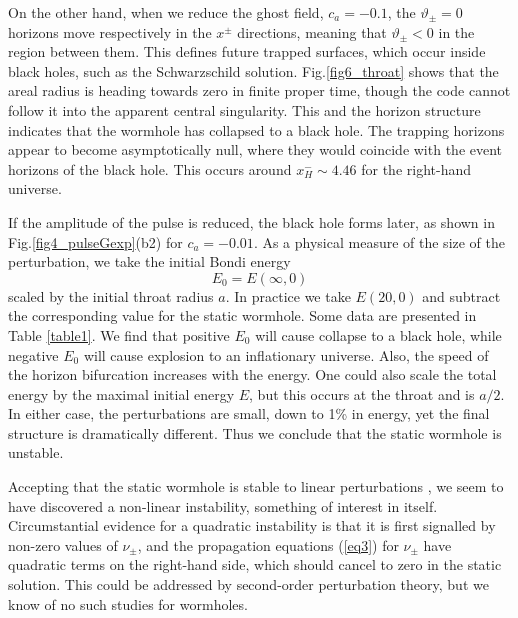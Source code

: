\documentclass[aps,showpacs,twocolumn,draft,eqsecnum]{revtex4}
\begin{document}
On the other hand, when we reduce the ghost field, $c_a = -0.1$, the
$\vartheta_\pm=0$ horizons move respectively in the $x^\pm$ directions, meaning
that $\vartheta_\pm<0$ in the region between them. This defines future trapped
surfaces, which occur inside black holes, such as the Schwarzschild solution.
Fig.\ref{fig6_throat} shows that the areal radius is heading towards zero in
finite proper time, though the code cannot follow it into the apparent central
singularity. This and the horizon structure indicates that the wormhole has
collapsed to a black hole. The trapping horizons appear to become
asymptotically null, where they would coincide with the event horizons of the
black hole. This occurs around $x^-_H \sim 4.46$ for the right-hand
universe.

If the amplitude of the pulse is reduced, the black hole forms later, as shown
in Fig.\ref{fig4_pulseGexp}(b2) for $c_a=-0.01$. As a physical measure of the
size of the perturbation, we take the initial Bondi energy
\begin{equation}
E_0=E(\infty,0)
\end{equation}
scaled by the initial throat radius $a$. In practice we take $E(20,0)$ and
subtract the corresponding value for the static wormhole. Some data are
presented in Table \ref{table1}. We find that positive $E_0$ will cause
collapse to a black hole, while negative $E_0$ will cause explosion to an
inflationary universe. Also, the speed of the horizon bifurcation increases
with the energy. One could also scale the total energy by the maximal initial
energy $E$, but this occurs at the throat and is $a/2$. In either case, the
perturbations are small, down to 1\% in energy, yet the final structure is
dramatically different. Thus we conclude that the static wormhole is unstable.

Accepting that the static wormhole is stable to linear perturbations
\cite{BCCF,AP}, we seem to have discovered a non-linear instability, something
of interest in itself. Circumstantial evidence for a quadratic instability is
that it is first signalled by non-zero values of $\nu_\pm$, and the propagation
equations (\ref{eq3}) for $\nu_\pm$ have quadratic terms on the right-hand
side, which should cancel to zero in the static solution. This could be
addressed by second-order perturbation theory, but we know of no such studies
for wormholes.
\end{document}

